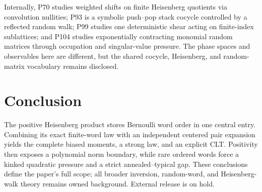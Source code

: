 \documentclass[11pt,a4paper]{amsart}
\theoremstyle{definition}
\theoremstyle{remark}
\begin{document}
Internally, P70 studies weighted shifts on finite Heisenberg quotients via
convolution nullities; P93 is a symbolic push--pop stack cocycle controlled
by a reflected random walk; P99 studies one deterministic shear acting on
finite-index sublattices; and P104 studies exponentially contracting
monomial random matrices through occupation and singular-value pressure.
The phase spaces and observables here are different, but the shared cocycle,
Heisenberg, and random-matrix vocabulary remains disclosed.

\section{Conclusion}

\enlargethispage{3\baselineskip}

The positive Heisenberg product stores Bernoulli word order in one central
entry.  Combining its exact finite-word law with an independent centered
pair expansion yields the complete biased moments, a strong law, and an
explicit CLT.  Positivity then exposes a polynomial norm boundary, while
rare ordered words force a kinked quadratic pressure and a strict
annealed--typical gap.  These conclusions define the paper's full scope;
all broader inversion, random-word, and Heisenberg-walk theory remains
owned background.  External release is on hold.



\end{document}
